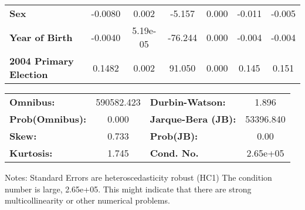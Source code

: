 \begin{center}
\begin{tabular}{lcccccc}
\textbf{Sex}                   &      -0.0080  &        0.002     &    -5.157  &         0.000        &       -0.011    &       -0.005     \\
\textbf{Year of Birth}         &      -0.0040  &     5.19e-05     &   -76.244  &         0.000        &       -0.004    &       -0.004     \\
\textbf{2004 Primary Election} &       0.1482  &        0.002     &    91.050  &         0.000        &        0.145    &        0.151     \\
\bottomrule
\end{tabular}
\begin{tabular}{lclc}
\textbf{Omnibus:}       & 590582.423 & \textbf{  Durbin-Watson:     } &     1.896  \\
\textbf{Prob(Omnibus):} &    0.000   & \textbf{  Jarque-Bera (JB):  } & 53396.840  \\
\textbf{Skew:}          &    0.733   & \textbf{  Prob(JB):          } &      0.00  \\
\textbf{Kurtosis:}      &    1.745   & \textbf{  Cond. No.          } &  2.65e+05  \\
\bottomrule
\end{tabular}
\end{center}

Notes: \newline
 [1] Standard Errors are heteroscedasticity robust (HC1) \newline
 [2] The condition number is large, 2.65e+05. This might indicate that there are \newline
 strong multicollinearity or other numerical problems.